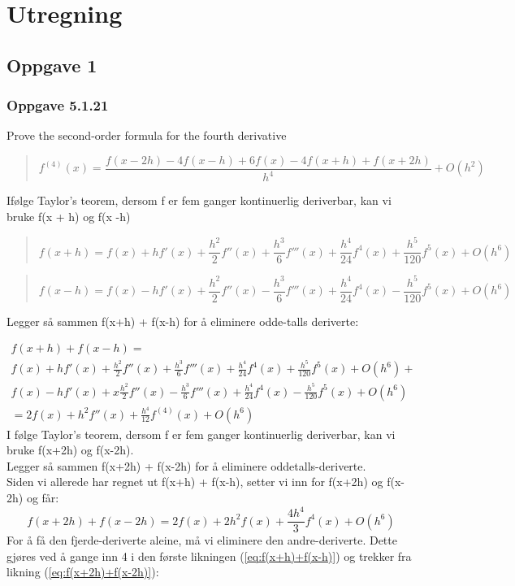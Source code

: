 \section{Utregning}

\subsection{Oppgave 1}
\subsubsection{Oppgave 5.1.21}
Prove the second-order formula for the fourth derivative
\begin{quote}
\begin{equation}\label{eq:oppgave1}
f^{(4)} (x) = \frac{f(x-2h) - 4f(x-h) + 6f(x) - 4f(x+h) + f(x+2h)}{h^4} + O(h^2)
\end{equation}
\end{quote}
Ifølge Taylor's teorem, dersom f er fem ganger kontinuerlig deriverbar, 
kan vi bruke f(x + h) og f(x -h)
\begin{quote}
\begin{equation} \label{eq:f(x+h)}
f(x+h) = f(x) + hf'(x) + \frac{h^2}{2} f''(x) + \frac{h^3}{6} f'''(x) + \frac{h^4}{24} f^4 (x) + \frac{h^5}{120} f^5 (x) + O(h^6)
\end{equation}
\end{quote}
\begin{quote}
\begin{equation} \label{eq:f(x-h)}
f(x-h) = f(x) - hf'(x) + \frac{h^2}{2} f''(x) - \frac{h^3}{6} f'''(x) + \frac{h^4}{24} f^4 (x) - \frac{h^5}{120} f^5 (x) + O(h^6)
\end{equation}
\end{quote}
Legger så sammen f(x+h) + f(x-h) for å eliminere odde-talls deriverte:

\begin{multline} \label{eq:f(x+h)+f(x-h)}
f(x+h) + f(x-h) = \\f(x) + hf'(x) + \frac{h^2}{2} f''(x) + \frac{h^3}{6} f'''(x) + \frac{h^4}{24} f^4 (x) + \frac{h^5}{120} f^5 (x) + O(h^6) +\\
 f(x) - hf'(x) + x\frac{h^2}{2} f''(x) - \frac{h^3}{6} f'''(x) + \frac{h^4}{24} f^4 (x) - \frac{h^5}{120} f^5 (x) + O(h^6) \\ = 2f(x) + h^2 f''(x) + \frac{h^4}{12} f^{(4)} (x) + O (h^6)
\end{multline}
I følge Taylor's teorem, dersom f er fem ganger kontinuerlig deriverbar, kan vi bruke f(x+2h) og f(x-2h). \\
Legger så sammen f(x+2h) + f(x-2h) for å eliminere oddetalls-deriverte. \\
Siden vi allerede har regnet ut f(x+h) + f(x-h), setter vi inn for f(x+2h) og f(x-2h) og får:
\begin{equation} \label{eq:f(x+2h)+f(x-2h)}
f(x+2h) + f(x-2h) = 2f(x) + 2h^2 f(x) + \frac{4h^4}{3} f^4 (x) + O (h^6)
\end{equation}
For å få den fjerde-deriverte aleine, må vi eliminere den andre-deriverte. Dette gjøres ved å gange inn 4 i den første likningen (\ref{eq:f(x+h)+f(x-h)}) og trekker fra likning (\ref{eq:f(x+2h)+f(x-2h)}): 

